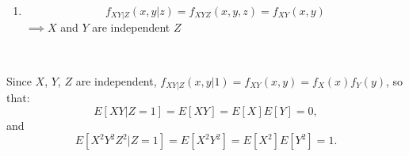 \begin{problem}{1}
\begin{enumerate}
\item

\begin{equation*}
f_{XY|Z}(x, y|z) = f_{XYZ}(x, y, z) = f_{XY}(x, y)
\end{equation*}
$\implies X$ and $Y$ are independent $Z$
\end{enumerate}

\end{problem}

\begin{problem}{2} $ $

Since $X$, $Y$, $Z$ are independent, $f_{XY|Z}(x, y|1) = f_{XY}(x, y) = f_X(x)f_Y(y)$, so that:
\begin{equation*}
E[XY|Z=1] = E[XY] = E[X]E[Y] = 0,
\end{equation*}
and
\begin{equation*}
E[X^2Y^2Z^2|Z=1] = E[X^2Y^2] = E[X^2]E[Y^2] = 1.
\end{equation*}

\end{problem}

